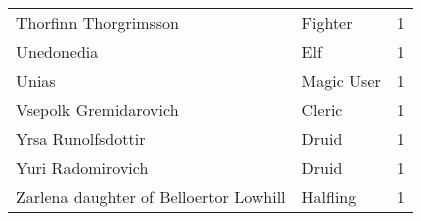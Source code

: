 \begin{tcolorbox}[breakable, title=Index by level]
\begin{supertabular}{p{0.6\columnwidth}lr}
Thorfinn Thorgrimsson                              & Fighter         &     1\\
Unedonedia                                         & Elf             &     1\\
Unias                                              & Magic User      &     1\\
Vsepolk Gremidarovich                              & Cleric          &     1\\
Yrsa Runolfsdottir                                 & Druid           &     1\\
Yuri Radomirovich                                  & Druid           &     1\\
Zarlena daughter of Belloertor Lowhill             & Halfling        &     1\\
\end{supertabular}
\end{tcolorbox}
\clearpage
